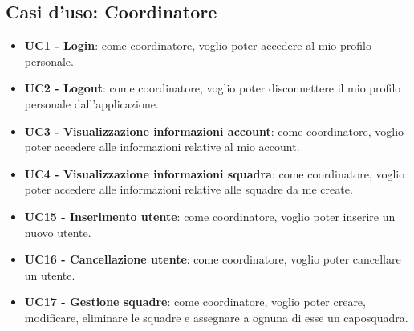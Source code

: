 \subsection{Casi d'uso: Coordinatore}
\begin{itemize}
	\item \textbf{UC1 - Login}:
	come coordinatore, voglio poter accedere al mio profilo personale.
	
	\item \textbf{UC2 - Logout}:
	come coordinatore, voglio poter disconnettere il mio profilo personale dall'applicazione.
	
	\item \textbf{UC3 - Visualizzazione informazioni account}:
	come coordinatore, voglio poter accedere alle informazioni relative al mio account.
	
	\item \textbf{UC4 - Visualizzazione informazioni squadra}:
	come coordinatore, voglio poter accedere alle informazioni relative alle squadre da me create.
	
	\item \textbf{UC15 - Inserimento utente}:
	come coordinatore, voglio poter inserire un nuovo utente.
	
	\item \textbf{UC16 - Cancellazione utente}:
	come coordinatore, voglio poter cancellare un utente.
	
	\item \textbf{UC17 - Gestione squadre}:
	come coordinatore, voglio poter creare, modificare, eliminare le squadre e assegnare a ognuna di esse un caposquadra.
\end{itemize}

\clearpage
